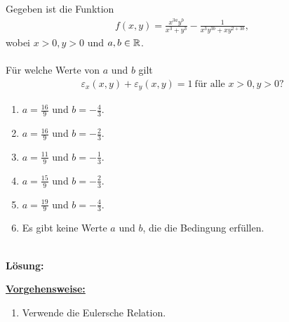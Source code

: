 \subsection*{}
Gegeben ist die Funktion
\begin{align*}
	f(x,y)
	=
	\frac{x^{3a} y^b}{x^3 +y^3}
	- 
	\frac{1}{x^3 y^{3b} + x y^{2 + 3b}},
\end{align*}
wobei $ x > 0, y > 0 $ und $ a,b \in \mathbb{R} $.\\
\\
Für welche Werte von $ a $ und $ b $ gilt
\begin{align*}
	\varepsilon_x(x,y) + \varepsilon_y(x,y) = 1 \ \textrm{für alle } x>0, y>0\textrm{?}
\end{align*}
\renewcommand{\labelenumi}{(\alph{enumi})}
\begin{enumerate}
	\item 
	$a = \frac{16}{9}$ und $ b=-\frac{4}{3} $.
	\item
	$a = \frac{16}{9}$ und $ b=-\frac{2}{3} $.
	\item
	$a = \frac{11}{9}$ und $ b=-\frac{1}{3} $.
	\item
	$a = \frac{15}{9}$ und $ b=-\frac{2}{3} $.
	\item
	$a = \frac{19}{9}$ und $ b=-\frac{4}{3} $.
	\item
	Es gibt keine Werte $ a $ und $ b $, die die Bedingung erfüllen.
\end{enumerate}
\ \\
\textbf{Lösung:}
\begin{mdframed}
\underline{\textbf{Vorgehensweise:}}
\renewcommand{\labelenumi}{\theenumi.}
\begin{enumerate}
\item Verwende die Eulersche Relation.
\end{enumerate}
\end{mdframed}

